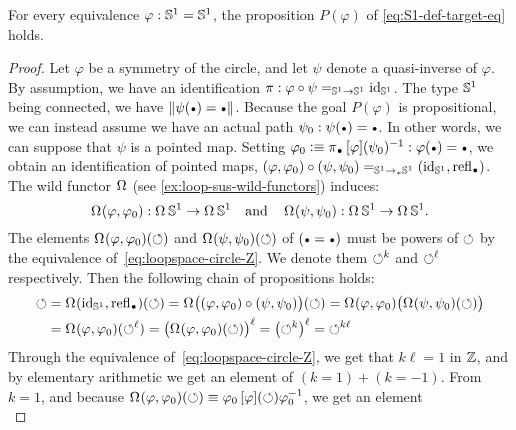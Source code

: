 \documentclass[english,a4paper]{lmcs}
\begin{document}
\begin{prop}
  \label{prop:S1-eq-either}%
  For every equivalence $\varphi:{{\mathbb S^{1}}}={{\mathbb S^{1}}}$, the proposition
  $P(\varphi)$ of \cref{eq:S1-def-target-eq} holds.
\end{prop}
\begin{proof}
  Let $\varphi$ be a symmetry of the circle, and let $\psi$ denote a
  quasi-inverse of $\varphi$.
  By assumption, we have an identification $\pi : \varphi\circ\psi =_{{{\mathbb S^{1}}}\to{{\mathbb S^{1}}}} \mathord{\mathrm{id}}_{{\mathbb S^{1}}}$.
  The type ${{\mathbb S^{1}}}$ being connected, we have
  $\Trunc{\psi(\base) = \base}$. Because the goal $P(\varphi)$ is
  propositional, we can instead assume we have an actual path
  $\psi_0\from \psi(\base) = \base$.
  In other words, we can suppose that $\psi$ is a pointed map.
  Setting $\varphi_0 \defequi \pi_{\base} \inv{\ap \varphi(\psi_0)} : \varphi(\base) = \base$,
  we obtain an identification of pointed maps,
  $(\varphi,\varphi_0) \circ (\psi,\psi_0) =_{\Sc\ptdto\Sc} (\id_\Sc, \refl\base)$.
  The wild functor $\loopspace \null$ (see \cref{ex:loop-sus-wild-functors}) induces:
  \begin{displaymath}
    \mathop{\Omega^{}} (\varphi,\varphi_0) : \mathop{\Omega^{}} {{\mathbb S^{1}}} \to \mathop{\Omega^{}} {{\mathbb S^{1}}}
    \quad\text{and}\quad
    \mathop{\Omega^{}} (\psi,\psi_0) : \mathop{\Omega^{}} {{\mathbb S^{1}}} \to \mathop{\Omega^{}} {{\mathbb S^{1}}}.
  \end{displaymath}
  The elements $\mathop{\Omega^{}} (\varphi,\varphi_0) (\mathord{\circlearrowleft})$ and
  $\mathop{\Omega^{}} (\psi,\psi_0) (\mathord{\circlearrowleft})$ of $(\base=\base)$ must be
  powers of $\mathord{\circlearrowleft}$ by the equivalence
  of~\cref{eq:loopspace-circle-Z}. We denote them $\mathord{\circlearrowleft}^k$ and
  $\mathord{\circlearrowleft}^\ell$ respectively. Then the following chain of propositions
  holds:
  \begin{align*}
    \Sloop
    &= \loopspace\null(\id_\Sc, \refl\base) (\Sloop)
    = \loopspace\null\bigl((\varphi,\varphi_0) \circ (\psi,\psi_0)\bigr) (\Sloop)
    = \loopspace\null(\varphi,\varphi_0)\bigl( \loopspace\null (\psi,\psi_0)(\Sloop) \bigr) \\
    &= \loopspace\null(\varphi,\varphi_0)(\Sloop^\ell)
    = \bigl(\loopspace\null(\varphi,\varphi_0)(\Sloop)\bigr)^\ell
    = \bigl(\Sloop^k\bigr)^\ell
    = \Sloop^{k\ell}
  \end{align*}
  Through the equivalence
  of~\cref{eq:loopspace-circle-Z}, we get that $k\ell=1$ in $\mathbb{Z}$,
  and by elementary arithmetic we get an element of $(k=1)+(k=-1)$.
  From $k=1$, and because
  $\mathop{\Omega^{}} (\varphi,\varphi_0)(\mathord{\circlearrowleft}) \equiv \varphi_0
  \mathop{\left[{\varphi}\right]}(\mathord{\circlearrowleft}) \varphi_0^{-1}$, we get an element
  \begin{displaymath}

\end{displaymath}
\end{proof}
\end{document}
